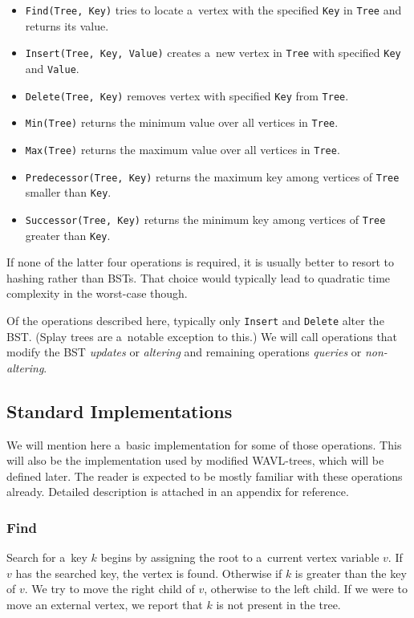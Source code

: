 \begin{itemize}
	\item \texttt{Find(Tree, Key)} tries to locate a~vertex with the specified \texttt{Key} in \texttt{Tree} and returns its value. 
	\item \texttt{Insert(Tree, Key, Value)} creates a~new vertex in \texttt{Tree} with specified \texttt{Key} and \texttt{Value}.
	\item \texttt{Delete(Tree, Key)} removes vertex with specified \texttt{Key} from \texttt{Tree}.
	\item \texttt{Min(Tree)} returns the minimum value over all vertices in \texttt{Tree}.
	\item \texttt{Max(Tree)} returns the maximum value over all vertices in \texttt{Tree}.
	\item \texttt{Predecessor(Tree, Key)} returns the maximum key among vertices of \texttt{Tree} smaller than \texttt{Key}.
	\item \texttt{Successor(Tree, Key)} returns the minimum key among vertices of \texttt{Tree} greater than \texttt{Key}.
\end{itemize}

If none of the latter four operations is required, it is usually better to resort to hashing rather than BSTs. That choice would typically lead to quadratic time complexity in the worst-case though.

Of the operations described here, typically only \texttt{Insert} and \texttt{Delete} alter the BST. (Splay trees \cite{splay} are a~notable exception to this.) We will call operations that modify the BST {\em updates} or {\em altering} and remaining operations {\em queries} or {\em non-altering}.

\subsection{Standard Implementations}

We will mention here a~basic implementation for some of those operations. This will also be the implementation used by modified WAVL-trees, which will be defined later. The reader is expected to be mostly familiar with these operations already. Detailed description is attached in an appendix for reference.

\subsubsection*{Find}
Search for a~key $k$ begins by assigning the root to a~current vertex variable $v$. If $v$ has the searched key, the vertex is found. Otherwise if $k$ is greater than the key of $v$. We try to move the right child of $v$, otherwise to the left child. If we were to move an external vertex, we report that $k$ is not present in the tree.

